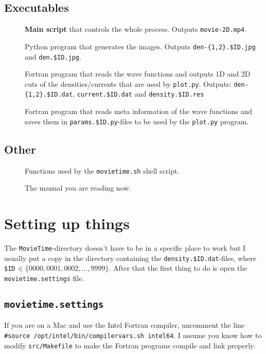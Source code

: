 \documentclass[10pt,a4paper]{article}
\begin{document}
\subsection{Executables}
\begin{description}
    \item[] \textbf{Main script} that controls the whole process. Outputs \verb+movie-2D.mp4+.
    \item[] Python program that generates the images. Outputs \verb+den-{1,2}.$ID.jpg+ and \verb+den.$ID.jpg+.
    \item[] Fortran program that reads the wave functions and outputs 1D and 2D cuts of the densities/currents that are used by \verb+plot.py+. Outputs: \verb+den-{1,2}.$ID.dat+, \verb+current.$ID.dat+ and \verb+density.$ID.res+
    \item[] Fortran program that reads meta information of the wave functions and saves them in \verb+params.$ID.py+-files to be used by the \verb+plot.py+ program.
\end{description}

\subsection{Other}
\begin{description}
    \item[] Functions used by the \verb+movietime.sh+ shell script.
    \item[] The manual you are reading now.
\end{description}

\section{Setting up things}

The \verb+MovieTime+-directory doesn't have to be in a specific place to work but I usually put a copy in the directory containing the \verb+density.$ID.dat+-files, where \verb+$ID+$\,\in \{0000, 0001, 0002, \ldots, 9999\}$. After that the first thing to do is open the \verb+movietime.settings+ file. 
\subsection{\protect\Verb+movietime.settings+}
If you are on a Mac and use the Intel Fortran compiler, uncomment the line \verb+#source /opt/intel/bin/compilervars.sh intel64+. I assume you know how to modify \verb+src/Makefile+ to make the Fortran programs compile and link properly.
\end{document}
